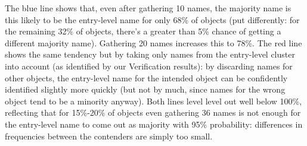 The blue line shows that, even after gathering 10 names, the majority name is this likely to be the entry-level name for only 68\% of objects (put differently: for the remaining 32\% of objects, there's a greater than 5\% chance of getting a different majority name).
Gathering 20 names increases this to 78\%.
The red line shows the same tendency but by taking only names from the entry-level cluster into account (as identified by our Verification results):
by discarding names for other objects, the entry-level name for the intended object can be confidently identified slightly more quickly (but not by much, since names for the wrong object tend to be a minority anyway).
Both lines level level out well below 100\%, reflecting that for 15\%-20\%  of objects even gathering 36 names is not enough for the entry-level name to come out as majority with 95\% probability: differences in frequencies between the contenders are simply too small.



